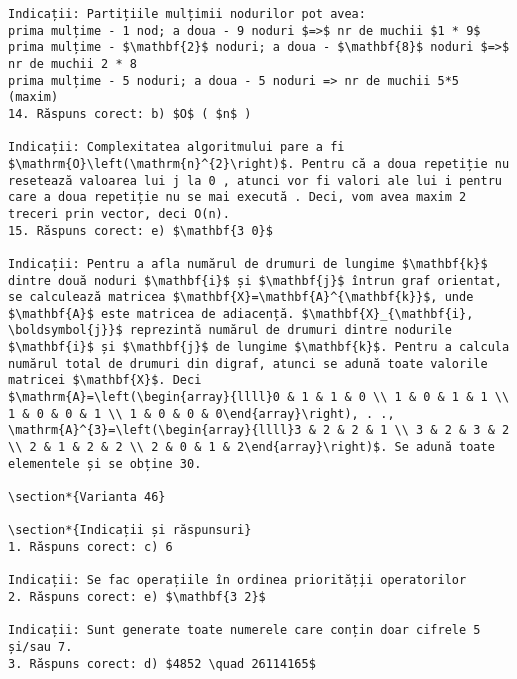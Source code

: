 \begin{verbatim}
Indicații: Partițiile mulțimii nodurilor pot avea:
prima mulțime - 1 nod; a doua - 9 noduri $=>$ nr de muchii $1 * 9$
prima mulțime - $\mathbf{2}$ noduri; a doua - $\mathbf{8}$ noduri $=>$ nr de muchii 2 * 8
prima mulțime - 5 noduri; a doua - 5 noduri => nr de muchii 5*5 (maxim)
14. Răspuns corect: b) $O$ ( $n$ )

Indicații: Complexitatea algoritmului pare a fi $\mathrm{O}\left(\mathrm{n}^{2}\right)$. Pentru că a doua repetiție nu resetează valoarea lui j la 0 , atunci vor fi valori ale lui i pentru care a doua repetiție nu se mai execută . Deci, vom avea maxim 2 treceri prin vector, deci O(n).
15. Răspuns corect: e) $\mathbf{3 0}$

Indicații: Pentru a afla numărul de drumuri de lungime $\mathbf{k}$ dintre două noduri $\mathbf{i}$ și $\mathbf{j}$ întrun graf orientat, se calculează matricea $\mathbf{X}=\mathbf{A}^{\mathbf{k}}$, unde $\mathbf{A}$ este matricea de adiacență. $\mathbf{X}_{\mathbf{i}, \boldsymbol{j}}$ reprezintă numărul de drumuri dintre nodurile $\mathbf{i}$ și $\mathbf{j}$ de lungime $\mathbf{k}$. Pentru a calcula numărul total de drumuri din digraf, atunci se adună toate valorile matricei $\mathbf{X}$. Deci
$\mathrm{A}=\left(\begin{array}{llll}0 & 1 & 1 & 0 \\ 1 & 0 & 1 & 1 \\ 1 & 0 & 0 & 1 \\ 1 & 0 & 0 & 0\end{array}\right), . ., \mathrm{A}^{3}=\left(\begin{array}{llll}3 & 2 & 2 & 1 \\ 3 & 2 & 3 & 2 \\ 2 & 1 & 2 & 2 \\ 2 & 0 & 1 & 2\end{array}\right)$. Se adună toate elementele și se obține 30.

\section*{Varianta 46}

\section*{Indicații și răspunsuri}
1. Răspuns corect: c) 6

Indicații: Se fac operațiile în ordinea priorităț̦ii operatorilor
2. Răspuns corect: e) $\mathbf{3 2}$

Indicații: Sunt generate toate numerele care conțin doar cifrele 5 și/sau 7.
3. Răspuns corect: d) $4852 \quad 26114165$


\end{verbatim}

